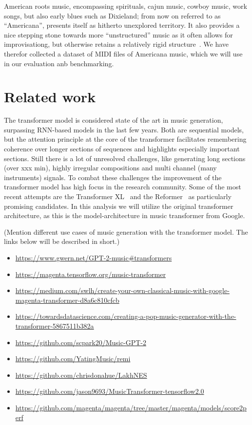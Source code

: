 \documentclass{article}
\begin{document}
        American roots music, encompassing spirituals, cajun music, cowboy music, work songs,
        but also early blues such as Dixieland; from now on referred to as ``Americana'', presents 
        itself as hitherto unexplored territory. It also provides a nice stepping stone
        towards more ``unstructured'' music as it often allows for improvisationg, but 
        otherwise retains a relatively rigid structure~\cite{libcong}.
        We have therefor collected a dataset of MIDI files of Americana music, which we
        will use in our evaluation anb benchmarking.

    \section{Related work}
       The transformer model is considered state of the art in music generation,
       surpassing RNN-based models in the last few years. Both are sequential models,
       but the attention principle at the core of the transformer facilitates
       remembering coherence over longer sections of sequences and highlights
       especially important sections. Still there is a lot of unresolved challenges,
       like generating long sections (over xxx min), highly irregular compositions
       and multi channel (many instruments) signals. To combat these challenges the
       improvement of the transformer model has high focus in the research community.
       Some of the most recent attempts are the Transformer
       XL~\cite{dai2019transformer} and the
       Reformer~\cite{kitaev2019reformer} as particularly promising candidates.
       In this analysis we
       will utilize the original transformer architecture, as this is the
       model-architecture in music transformer from Google.
        
        (Mention different use cases of music generation with the transformer model.
        The links below will be described in short.)
        
        \begin{itemize}
            \item \url{https://www.gwern.net/GPT-2-music#transformers}
            \item \url{https://magenta.tensorflow.org/music-transformer}
            \item \url{https://medium.com/swlh/create-your-own-classical-music-with-google-magenta-transformer-d8a6c810cfcb}
            \item \url{https://towardsdatascience.com/creating-a-pop-music-generator-with-the-transformer-5867511b382a}
            \item \url{https://github.com/scpark20/Music-GPT-2}
            \item \url{https://github.com/YatingMusic/remi}
            \item \url{https://github.com/chrisdonahue/LakhNES}
            \item \url{https://github.com/jason9693/MusicTransformer-tensorflow2.0}
            \item \url{https://github.com/magenta/magenta/tree/master/magenta/models/score2perf}
        \end{itemize}
\end{document}
